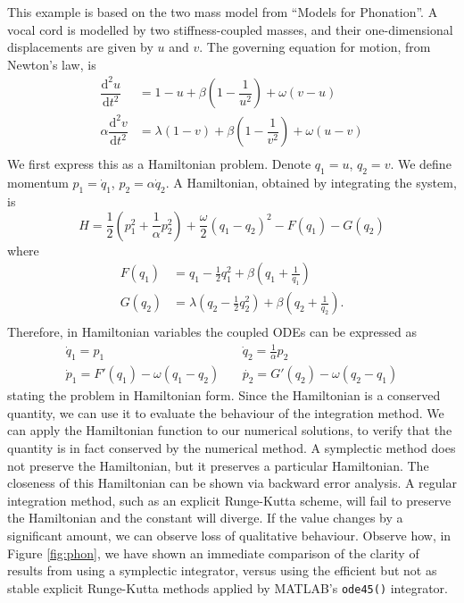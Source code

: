 This example is based on the two mass model from ``Models for Phonation''.
A vocal cord is modelled by two stiffness-coupled masses, and their one-dimensional displacements are given by $u$ and $v$.
The governing equation for motion, from Newton's law, is
\begin{align*}
	\dfrac{\mathrm{d}^2 u}{\mathrm{d}t^2} &= 1 - u + \beta \left(1 - \dfrac{1}{u^2}\right) + \omega (v - u) \\
	\alpha \dfrac{\mathrm{d}^2 v}{\mathrm{d}t^2} &= \lambda(1 - v) + \beta \left(1 - \dfrac{1}{v^2}\right) + \omega (u - v) \\
\end{align*}
We first express this as a Hamiltonian problem. Denote $q_1 = u$, $q_2 = v$.
We define momentum $p_1 = \dot{q}_1$, $p_2 = \alpha \dot{q}_2$.
A Hamiltonian, obtained by integrating the system, is
\begin{equation*}
	H = \frac{1}{2} \left( p_1^2 + \frac{1}{\alpha} p_2^2 \right) + \frac{\omega}{2}(q_1 - q_2)^2 - F(q_1) - G(q_2)
\end{equation*}
where
\begin{align*}
	F(q_1) &= q_1 - \frac{1}{2}q_1^2 + \beta \left( q_1 + \frac{1}{q_1} \right) \\
	G(q_2) &= \lambda \left(q_2 - \frac{1}{2}q_2^2 \right) + \beta \left( q_2 + \frac{1}{q_2} \right). \\
\end{align*}
Therefore, in Hamiltonian variables the coupled ODEs can be expressed as
\begin{eqnarray*}
	\dot{q}_1 = p_1 & ~ & \dot{q}_2 = \frac{1}{\alpha} p_2 \\
	\dot{p}_1 = F'(q_1) - \omega(q_1 - q_2) & ~ & \dot{p_2} = G'(q_2) - \omega(q_2 - q_1)
\end{eqnarray*}
stating the problem in Hamiltonian form.
Since the Hamiltonian is a conserved quantity, we can use it to evaluate the behaviour of the integration method.
We can apply the Hamiltonian function to our numerical solutions, to verify that the quantity is in fact conserved by the numerical method.
A symplectic method does not preserve the Hamiltonian, but it preserves a particular Hamiltonian.
The closeness of this Hamiltonian can be shown via backward error analysis.
A regular integration method, such as an explicit Runge-Kutta scheme, will fail to preserve the Hamiltonian and the constant will diverge.
If the value changes by a significant amount, we can observe loss of qualitative behaviour.
Observe how, in Figure \ref{fig:phon}, we have shown an immediate comparison of the clarity of results from using a symplectic integrator,
versus using the efficient but not as stable explicit Runge-Kutta methods applied by MATLAB's \texttt{ode45()} integrator.

